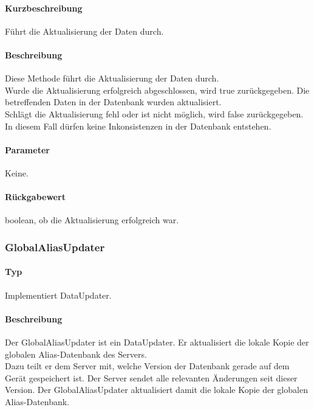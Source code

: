\paragraph*{Kurzbeschreibung}
Führt die Aktualisierung der Daten durch.
\paragraph*{Beschreibung}
Diese Methode führt die Aktualisierung der Daten durch.\\
Wurde die Aktualisierung erfolgreich abgeschlossen, wird true zurückgegeben. 
Die betreffenden Daten in der Datenbank wurden aktualisiert.\\
Schlägt die Aktualisierung fehl oder ist nicht möglich, wird false zurückgegeben.
In diesem Fall dürfen keine Inkonsistenzen in der Datenbank entstehen.
\paragraph*{Parameter}
Keine.
\paragraph*{Rückgabewert}
boolean, ob die Aktualisierung erfolgreich war.

\subsubsection{GlobalAliasUpdater}
\paragraph*{Typ}
Implementiert DataUpdater.
\paragraph*{Beschreibung}
Der GlobalAliasUpdater ist ein DataUpdater. Er aktualisiert die lokale Kopie der globalen
Alias-Datenbank des Servers. \\
Dazu teilt er dem Server mit, welche Version der Datenbank gerade auf dem Gerät 
gespeichert ist. Der Server sendet alle relevanten Änderungen seit dieser Version. 
Der GlobalAliasUpdater aktualisiert damit die lokale Kopie der globalen Alias-Datenbank.